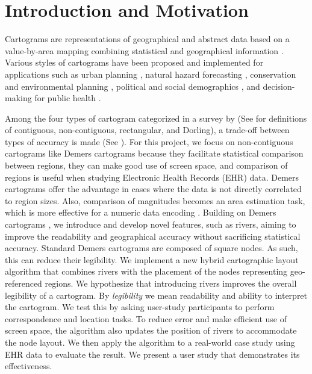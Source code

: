 \section{Introduction and Motivation}

Cartograms are representations of geographical and abstract data based on a value-by-area mapping combining statistical and geographical information \cite{dent2009Cartography,inoue2011New}. 
Various styles of cartograms have been proposed and implemented for applications such as urban planning \cite{harris2018Mapping, arranz-lopez2021Enduser}, natural hazard forecasting \cite{pappenberger2019Cartograms, park2020Flood}, conservation and environmental planning \cite{galluzzi2018Mapping, rocchini2019Cartogramming}, political and social demographics \cite{breitzman2018Using, alieva2021How}, and decision-making for public health \cite{gao2020Visualising, sack2021Visualizing}.

Among the four types of cartogram categorized in a survey by  (See  for definitions of contiguous, non-contiguous, rectangular, and Dorling), a trade-off between types of accuracy is made (See ).
For this project, we focus on non-contiguous cartograms like Demers cartograms because they facilitate statistical comparison between regions, they can make good use of screen space, and comparison of regions is useful when studying Electronic Health Records (EHR) data.
Demers cartograms offer the advantage in cases where the data is not directly correlated to region sizes. Also, comparison of magnitudes becomes an area estimation task, which is more effective for a numeric data encoding \cite{munzner2014Visualization}.
Building on Demers cartograms \cite{ian2002Cartogram}, we introduce and develop novel features, such as rivers, aiming to improve the readability and geographical accuracy without sacrificing statistical accuracy.
Standard Demers cartograms are composed of square nodes. As such, this can reduce their legibility.
We implement a new hybrid cartographic layout algorithm that combines rivers with the placement of the nodes representing geo-referenced regions. 
We hypothesize that introducing rivers improves the overall legibility of a cartogram. 
By \textit{legibility} we mean readability and ability to interpret the cartogram.  
We test this by asking user-study participants to perform correspondence and location tasks.
To reduce error and make efficient use of screen space, the algorithm also updates the position of rivers to accommodate the node layout.
We then apply the algorithm to a real-world case study using EHR data to evaluate the result.
We present a user study that demonstrates its effectiveness.

